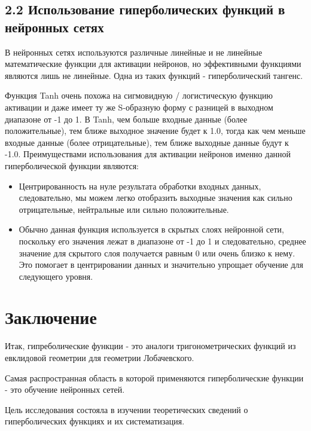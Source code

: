 \documentclass{article}
\begin{document}
\subsection*{2.2 Использование гиперболических функций в нейронных сетях}

В нейронных сетях используются различные линейные и не линейные математические функции для активации нейронов, но эффективными функциями являются лишь не линейные. Одна из таких функций - гиперболический тангенс.

Функция Tanh очень похожа на сигмовидную / логистическую функцию активации и даже имеет ту же S-образную форму с разницей в выходном диапазоне от -1 до 1. В Tanh, чем больше входные данные (более положительные), тем ближе выходное значение будет к 1.0, тогда как чем меньше входные данные (более отрицательные), тем ближе выходные данные будут к -1.0.
Преимуществами использования для активации нейронов именно данной гиперболической функции являются:
\begin{itemize}
    \item Центрированность на нуле результата обработки входных данных, следовательно, мы можем легко отобразить выходные значения как сильно отрицательные, нейтральные или сильно положительные.
    \item Обычно данная функция используется в скрытых слоях нейронной сети, поскольку его значения лежат в диапазоне от -1 до 1 и следовательно, среднее значение для скрытого слоя получается равным 0 или очень близко к нему. Это помогает в центрировании данных и значительно упрощает обучение для следующего уровня.
\end{itemize}

\newpage
\section*{Заключение}

Итак, гипреболические функции - это аналоги тригонометрических функций из евклидовой геометрии для геометрии Лобачевского.

Самая распространная область в которой применяются гиперболические функции - это обучение нейронных сетей.

Цель исследования состояла в изучении теоретических сведений о гиперболических функциях и их систематизация.
\end{document}
